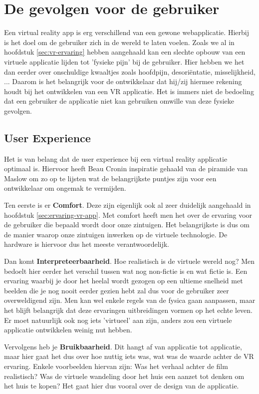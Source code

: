 \section{De gevolgen voor de gebruiker}
\label{sec:gevolgen-vr}
Een virtual reality app is erg verschillend van een gewone webapplicatie. Hierbij is het doel om de gebruiker zich in de wereld te laten voelen. Zoals we al in hoofdstuk \ref{sec:vr-ervaring} hebben aangehaald kan een slechte opbouw van een virtuele applicatie lijden tot 'fysieke pijn' bij de gebruiker. Hier hebben we het dan eerder over onschuldige kwaaltjes zoals hoofdpijn, desoriëntatie, misselijkheid, ... Daarom is het belangrijk voor de ontwikkelaar dat hij/zij hiermee rekening houdt bij het ontwikkelen van een VR applicatie. Het is immers niet de bedoeling dat een gebruiker de applicatie niet kan gebruiken omwille van deze fysieke gevolgen.

\subsection{User Experience}
\label{subsec:user-experience}
Het is van belang dat de user experience bij een virtual reality applicatie optimaal is. Hiervoor heeft Beau Cronin \autocite{Cronin2015} inspiratie gehaald van de piramide van Maslow om zo op te lijsten wat de belangrijkste puntjes zijn voor een ontwikkelaar om ongemak te vermijden.

Ten eerste is er \textbf{Comfort}. Deze zijn eigenlijk ook al zeer duidelijk aangehaald in hoofdstuk \ref{sec:ervaring-vr-app}. Met comfort heeft men het over de ervaring voor de gebruiker die bepaald wordt door onze zintuigen. Het belangrijkste is dus om de manier waarop onze zintuigen inwerken op de virtuele technologie. De hardware is hiervoor dus het meeste verantwoordelijk.

Dan komt \textbf{Interpreteerbaarheid}. Hoe realistisch is de virtuele wereld nog? Men bedoelt hier eerder het verschil tussen wat nog non-fictie is en wat fictie is. Een ervaring waarbij je door het heelal wordt gezogen op een ultieme snelheid met beelden die je nog nooit eerder gezien hebt zal dus voor de gebruiker zeer overweldigend zijn. Men kan wel enkele regels van de fysica gaan aanpassen, maar het blijft belangrijk dat deze ervaringen uitbreidingen vormen op het echte leven. Er moet natuurlijk ook nog iets 'virtueel' aan zijn, anders zou een virtuele applicatie ontwikkelen weinig nut hebben.

Vervolgens heb je \textbf{Bruikbaarheid}. Dit hangt af van applicatie tot applicatie, maar hier gaat het dus over hoe nuttig iets was, wat was de waarde achter de VR ervaring. Enkele voorbeelden hiervan zijn: Was het verhaal achter de film realistisch? Was de virtuele wandeling door het huis een aanzet tot denken om het huis te kopen? Het gaat hier dus vooral over de design van de applicatie.

